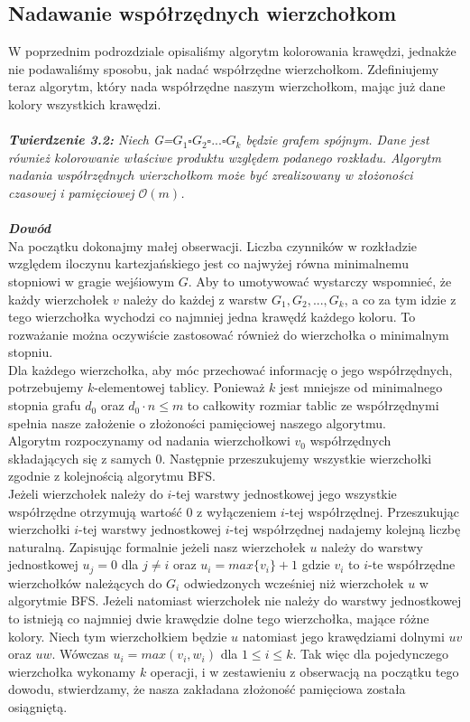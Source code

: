 \documentclass[12pt,a4paper,titlepage]{article}
\begin{document}
\subsection{Nadawanie współrzędnych wierzchołkom}
W poprzednim podrozdziale opisaliśmy algorytm kolorowania krawędzi, jednakże nie podawaliśmy sposobu, jak nadać współrzędne wierzchołkom. Zdefiniujemy teraz algorytm, który nada współrzędne naszym wierzchołkom, mając już dane kolory wszystkich krawędzi.\\
\\
\textit{\textbf{Twierdzenie 3.2:} Niech G=$G_1 \square G_2 \square ... \square G_k$ będzie grafem spójnym. Dane jest również kolorowanie właściwe produktu względem podanego rozkładu. Algorytm nadania współrzędnych wierzchołkom może być zrealizowany w złożoności czasowej i pamięciowej $\mathcal{O}(m)$.}\\
\\
\textit{\textbf{Dowód}}\\
Na początku dokonajmy małej obserwacji. Liczba czynników w rozkładzie względem iloczynu kartezjańskiego jest co najwyżej równa minimalnemu stopniowi w gragie wejśiowym $G$. Aby to umotywować wystarczy wspomnieć, że każdy wierzchołek $v$ należy do każdej z warstw $G_1, G_2, ..., G_k$, a co za tym idzie z tego wierzchołka wychodzi co najmniej jedna krawędź każdego koloru. To rozważanie można oczywiście zastosować również do wierzchołka o minimalnym stopniu.\\
Dla każdego wierzchołka, aby móc przechować informację o jego współrzędnych, potrzebujemy $k$-elementowej tablicy. Ponieważ $k$ jest mniejsze od minimalnego stopnia grafu $d_0$ oraz $d_0 \cdot n \leqslant m$ to całkowity rozmiar tablic ze współrzędnymi spełnia nasze założenie o złożoności pamięciowej naszego algorytmu.\\
Algorytm rozpoczynamy od nadania wierzchołkowi $v_0$ współrzędnych składających się z samych 0. Następnie przeszukujemy wszystkie wierzchołki zgodnie z kolejnością algorytmu BFS. \\Jeżeli wierzchołek należy do $i$-tej warstwy jednostkowej jego wszystkie współrzędne otrzymują wartość 0 z wyłączeniem $i$-tej współrzędnej. Przeszukując wierzchołki $i$-tej warstwy jednostkowej $i$-tej współrzędnej nadajemy kolejną liczbę naturalną. Zapisując formalnie jeżeli nasz wierzchołek $u$ należy do warstwy jednostkowej $u_j =0$ dla $j \neq i$
oraz $u_i = max\{v_i\}+1$ gdzie $v_i $ to $i$-te współrzędne wierzchołków należących do $G_i$ odwiedzonych wcześniej niż wierzchołek $u$ w algorytmie BFS. 
Jeżeli natomiast wierzchołek nie należy do warstwy jednostkowej to istnieją co najmniej dwie krawędzie dolne tego wierzchołka, mające różne kolory. Niech tym wierzchołkiem będzie $u$ natomiast jego krawędziami dolnymi $uv$ oraz $uw$. Wówczas $u_i = max(v_i , w_i )$ dla $1 \leqslant i \leqslant k$. Tak więc dla pojedynczego wierzchołka wykonamy $k$ operacji, i w zestawieniu z obserwacją na początku tego dowodu, stwierdzamy, że nasza zakładana złożoność pamięciowa została osiągniętą.
\newpage
\end{document}
